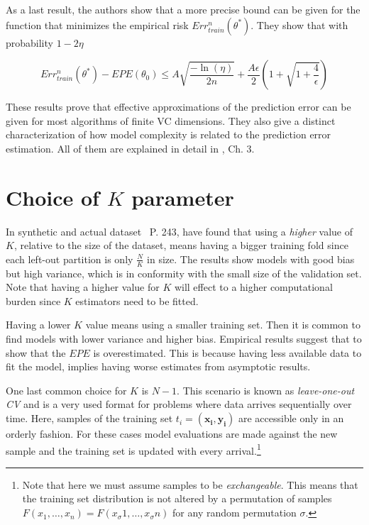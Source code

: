 As a last result, the authors show that a more precise bound can be given for the function that minimizes the empirical risk $Err^n_{train}(\theta^*)$.
They show that with probability $1 - 2\eta$

\begin{equation}
Err^n_{train}(\theta^*) - EPE(\theta_0) \leq A \sqrt{\frac{-\ln(\eta)}{2n} } + \frac{A \epsilon}{2}\left( 1+ \sqrt{1 + \frac{4}{\epsilon} } \right)
\end{equation}\label{eq:vapnik-classificationBoundPrecise}

These results prove that effective approximations of the prediction error can be given for most algorithms of finite VC dimensions.
They also give a distinct characterization of how model complexity is related to the prediction error estimation.
All of them are explained in detail in \textcite{vapnik-nature2000}, Ch. 3. 



\section{Choice of \texorpdfstring{$K$ parameter}{Lg} }\label{appx:sec:optimalKfoldNumber}

In synthetic and actual dataset~\textcite{hastie-elemstatslearn} P.
243, have found that using a \textit{higher} value of $K$, relative to the size of the dataset, means having a bigger training fold since each left-out partition is only $\frac{N}{K}$ in size.
The results show models with good bias but high variance, which is in conformity with the small size of the validation set.
Note that having a higher value for $K$ will effect to a higher computational burden since $K$ estimators need to be fitted.

Having a lower $K$ value means using a smaller training set.
Then it is common to find models with lower variance and higher bias.
Empirical results suggest that to show that the $EPE$ is overestimated.
This is because having less available data to fit the model, implies having worse estimates from asymptotic results.

One last common choice for $K$ is $N-1$.
This scenario is known as \textit{leave-one-out CV} and is a very used format for problems where data arrives sequentially over time.
Here, samples of the training set $t_i = ( \boldsymbol{x_i} , \boldsymbol{y_i} )$ are accessible only in an orderly fashion.
For these cases model evaluations are made against the new sample and the training set is updated with every arrival.\footnote{Note that here we must assume samples to be \textit{exchangeable}.
	This means that the training set distribution is not altered by a permutation of samples $F(x_1,\ldots,x_n ) = F(x_\sigma{1},\ldots,x_\sigma{n})$ for any random permutation $\sigma$.}


